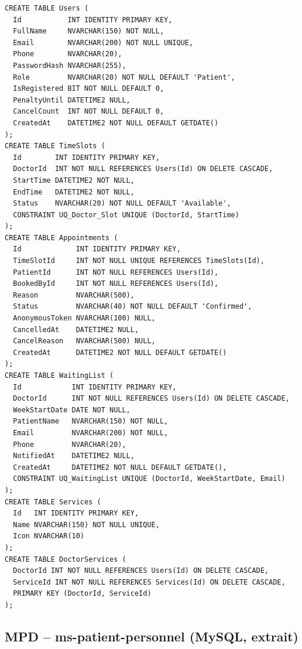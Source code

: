 \begin{lstlisting}[style=sql, caption={Tables MedicalAppointments}]
CREATE TABLE Users (
  Id           INT IDENTITY PRIMARY KEY,
  FullName     NVARCHAR(150) NOT NULL,
  Email        NVARCHAR(200) NOT NULL UNIQUE,
  Phone        NVARCHAR(20),
  PasswordHash NVARCHAR(255),
  Role         NVARCHAR(20) NOT NULL DEFAULT 'Patient',
  IsRegistered BIT NOT NULL DEFAULT 0,
  PenaltyUntil DATETIME2 NULL,
  CancelCount  INT NOT NULL DEFAULT 0,
  CreatedAt    DATETIME2 NOT NULL DEFAULT GETDATE()
);
CREATE TABLE TimeSlots (
  Id        INT IDENTITY PRIMARY KEY,
  DoctorId  INT NOT NULL REFERENCES Users(Id) ON DELETE CASCADE,
  StartTime DATETIME2 NOT NULL,
  EndTime   DATETIME2 NOT NULL,
  Status    NVARCHAR(20) NOT NULL DEFAULT 'Available',
  CONSTRAINT UQ_Doctor_Slot UNIQUE (DoctorId, StartTime)
);
CREATE TABLE Appointments (
  Id             INT IDENTITY PRIMARY KEY,
  TimeSlotId     INT NOT NULL UNIQUE REFERENCES TimeSlots(Id),
  PatientId      INT NOT NULL REFERENCES Users(Id),
  BookedById     INT NOT NULL REFERENCES Users(Id),
  Reason         NVARCHAR(500),
  Status         NVARCHAR(40) NOT NULL DEFAULT 'Confirmed',
  AnonymousToken NVARCHAR(100) NULL,
  CancelledAt    DATETIME2 NULL,
  CancelReason   NVARCHAR(500) NULL,
  CreatedAt      DATETIME2 NOT NULL DEFAULT GETDATE()
);
CREATE TABLE WaitingList (
  Id            INT IDENTITY PRIMARY KEY,
  DoctorId      INT NOT NULL REFERENCES Users(Id) ON DELETE CASCADE,
  WeekStartDate DATE NOT NULL,
  PatientName   NVARCHAR(150) NOT NULL,
  Email         NVARCHAR(200) NOT NULL,
  Phone         NVARCHAR(20),
  NotifiedAt    DATETIME2 NULL,
  CreatedAt     DATETIME2 NOT NULL DEFAULT GETDATE(),
  CONSTRAINT UQ_WaitingList UNIQUE (DoctorId, WeekStartDate, Email)
);
CREATE TABLE Services (
  Id   INT IDENTITY PRIMARY KEY,
  Name NVARCHAR(150) NOT NULL UNIQUE,
  Icon NVARCHAR(10)
);
CREATE TABLE DoctorServices (
  DoctorId INT NOT NULL REFERENCES Users(Id) ON DELETE CASCADE,
  ServiceId INT NOT NULL REFERENCES Services(Id) ON DELETE CASCADE,
  PRIMARY KEY (DoctorId, ServiceId)
);
\end{lstlisting}

\subsection{MPD -- ms-patient-personnel (MySQL, extrait)}

